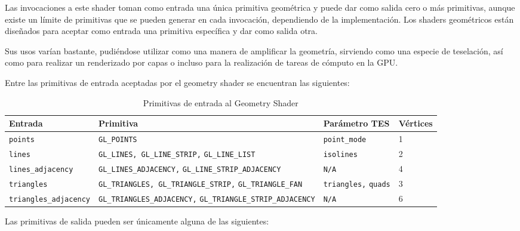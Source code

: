 Las invocaciones a este shader toman como entrada una única primitiva geométrica
y puede dar como salida cero o más primitivas, aunque existe un límite de
primitivas que se pueden generar en cada invocación, dependiendo de la
implementación. Los shaders geométricos están diseñados para aceptar como
entrada una primitiva específica y dar como salida otra. 

Sus usos varían bastante, pudiéndose utilizar como una manera de amplificar la
geometría, sirviendo como una especie de teselación, así como para realizar un
renderizado por capas o incluso para la realización de tareas de cómputo en la
GPU. 

Entre las primitivas de entrada aceptadas por el geometry shader se encuentran
las siguientes:

\begin{table}[ht]
		\begin{tabular}{|m{4cm}|m{7cm}|m{2.2cm}|m{1.5cm}|}

			\hline
			Entrada & Primitiva & Parámetro TES & Vértices\\
			\hline

			\verb|points| & \verb|GL_POINTS| & \verb|point_mode| & 1 \\
			\hline

			\verb|lines| & \verb|GL_LINES, GL_LINE_STRIP,| \verb|GL_LINE_LIST| &
			\verb|isolines| & 2\\

			\hline

			\verb|lines_adjacency| & \verb|GL_LINES_ADJACENCY,|
			\verb|GL_LINE_STRIP_ADJACENCY| & \verb|N/A| & 4\\

			\hline

			\verb|triangles| & \verb|GL_TRIANGLES, GL_TRIANGLE_STRIP,|
			\verb|GL_TRIANGLE_FAN| & \verb|triangles,| \verb|quads| & 3 \\

			\hline

			\verb|triangles_adjacency| & \verb|GL_TRIANGLES_ADJACENCY,|
			\verb|GL_TRIANGLE_STRIP_ADJACENCY| & \verb|N/A| & 6 \\

			\hline
		\end{tabular}
		\caption{Primitivas de entrada al Geometry Shader}
		\label{tabla3.1}
\end{table}

Las primitivas de salida pueden ser únicamente alguna de las siguientes:

